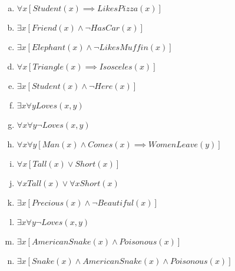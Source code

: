 \documentclass{article}
\begin{document}
\begin{enumerate}[(a)]
\item $\forall x [Student(x) \implies LikesPizza(x)]$
\item $\exists x [Friend(x) \wedge \neg HasCar(x)]$
\item $\exists x [Elephant(x) \wedge \neg LikesMuffin(x)]$
\item $\forall x [Triangle(x) \implies Isosceles(x)]$
\item $\exists x [Student(x) \wedge \neg Here(x)]$
\item $\exists x \forall y Loves(x, y)$
\item $\forall x \forall y \neg Loves(x, y)$
\item $\forall x \forall y[Man(x) \wedge Comes(x) \implies WomenLeave(y)]$
\item $\forall x [Tall(x) \vee Short(x)]$
\item $\forall x Tall(x) \vee \forall x Short(x)$
\item $\exists x [Precious(x) \wedge \neg Beautiful(x)]$
\item $\exists x \forall y \neg Loves(x, y)$
\item $\exists x [AmericanSnake(x) \wedge Poisonous(x)]$
\item $\exists x [Snake(x) \wedge AmericanSnake(x) \wedge Poisonous(x)]$
\end{enumerate}

\section{}
\end{document}
